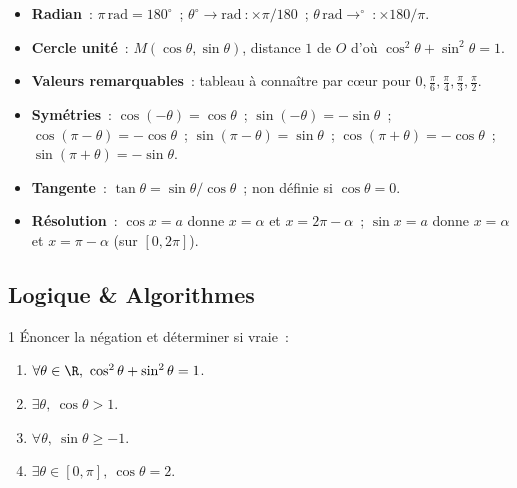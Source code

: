 \begin{bilan}
\begin{itemize}
  \item \textbf{Radian}~: $\pi\,\text{rad}=180^{\circ}$~;
        $\theta^{\circ}\to\text{rad}~: \times\pi/180$~;
        $\theta\,\text{rad}\to^{\circ}~: \times180/\pi$.
  \item \textbf{Cercle unit\'e}~: $M(\cos\theta,\sin\theta)$,
        distance $1$ de $O$ d'o\`u $\cos^2\theta+\sin^2\theta=1$.
  \item \textbf{Valeurs remarquables}~: tableau \`a conna\^itre par c\oe ur
        pour $0, \frac{\pi}{6}, \frac{\pi}{4}, \frac{\pi}{3}, \frac{\pi}{2}$.
  \item \textbf{Sym\'etries}~:
        $\cos(-\theta)=\cos\theta$~; $\sin(-\theta)=-\sin\theta$~;
        $\cos(\pi-\theta)=-\cos\theta$~; $\sin(\pi-\theta)=\sin\theta$~;
        $\cos(\pi+\theta)=-\cos\theta$~; $\sin(\pi+\theta)=-\sin\theta$.
  \item \textbf{Tangente}~: $\tan\theta=\sin\theta/\cos\theta$~;
        non d\'efinie si $\cos\theta=0$.
  \item \textbf{R\'esolution}~: $\cos x=a$ donne $x=\alpha$ et $x=2\pi-\alpha$~;
        $\sin x=a$ donne $x=\alpha$ et $x=\pi-\alpha$ (sur $[0,2\pi]$).
\end{itemize}
\end{bilan}

\subsection*{Logique \& Algorithmes}

\begin{exo}{1}
\'Enoncer la n\'egation et d\'eterminer si vraie~:
\begin{enumerate}
  \item $\forall\theta\in\R,\ \cos^2\theta+\sin^2\theta=1$.
  \item $\exists\theta,\ \cos\theta>1$.
  \item $\forall\theta,\ \sin\theta\geq-1$.
  \item $\exists\theta\in[0,\pi],\ \cos\theta=2$.
\end{enumerate}
\end{exo}

